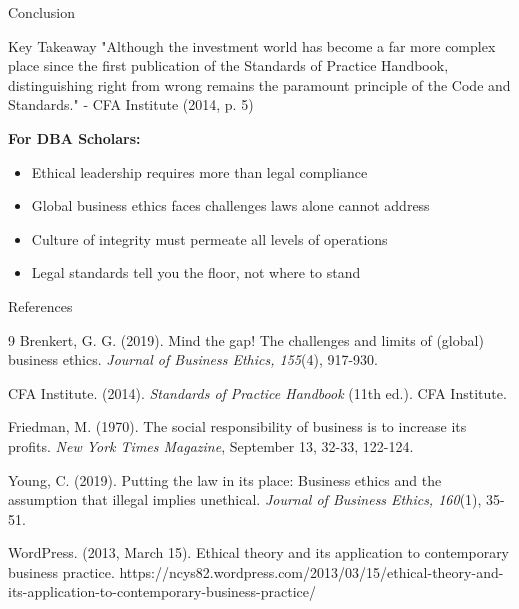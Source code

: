 \documentclass{beamer}
\begin{document}
	\begin{frame}{Conclusion}
		\begin{block}{Key Takeaway}
			"Although the investment world has become a far more complex place since the first publication of the Standards of Practice Handbook, distinguishing right from wrong remains the paramount principle of the Code and Standards."
			- CFA Institute (2014, p. 5)
		\end{block}
		
		\vspace{0.2cm}
		\textbf{For DBA Scholars:}
		\begin{itemize}
			\item Ethical leadership requires \textcolor{cfablue}{more than legal compliance}
			\item Global business ethics faces challenges laws alone cannot address
			\item Culture of integrity must permeate all levels of operations
			\item Legal standards tell you the \textcolor{cfablue}{floor}, not where to stand
		\end{itemize}
	\end{frame}
	
	\begin{frame}{References}
		\small
		\begin{thebibliography}{9}
			Brenkert, G. G. (2019). Mind the gap! The challenges and limits of (global) business ethics. \textit{Journal of Business Ethics, 155}(4), 917-930.
			
			CFA Institute. (2014). \textit{Standards of Practice Handbook} (11th ed.). CFA Institute.
			
			Friedman, M. (1970). The social responsibility of business is to increase its profits. \textit{New York Times Magazine}, September 13, 32-33, 122-124.
			
			Young, C. (2019). Putting the law in its place: Business ethics and the assumption that illegal implies unethical. \textit{Journal of Business Ethics, 160}(1), 35-51.
			
			WordPress. (2013, March 15). Ethical theory and its application to contemporary business practice. https://ncys82.wordpress.com/2013/03/15/ethical-theory-and-its-application-to-contemporary-business-practice/
		\end{thebibliography}
	\end{frame}
	
\end{document}
